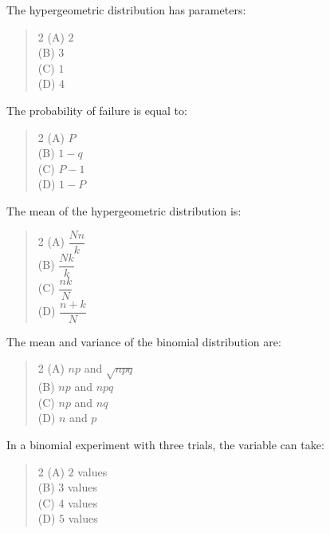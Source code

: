\documentclass[11pt,a4paper]{article}
\begin{document}
\begin{mcqlist}
\item The hypergeometric distribution has \underline{\hspace{1.5cm}} parameters:
\begin{quote}\begin{multicols}{2}
\noindent (A) $2$ \\
(B) $3$ \\
(C) $1$ \\
(D) $4$
\end{multicols}\end{quote}

\item The probability of failure is equal to:
\begin{quote}\begin{multicols}{2}
\noindent (A) $P$ \\
(B) $1-q$ \\
(C) $P-1$ \\
(D) $1-P$
\end{multicols}\end{quote}

\item The mean of the hypergeometric distribution is:
\begin{quote}\begin{multicols}{2}
\noindent (A) $\dfrac{Nn}{k}$ \\
(B) $\dfrac{Nk}{k}$ \\
(C) $\dfrac{nk}{N}$ \\
(D) $\dfrac{n+k}{N}$
\end{multicols}\end{quote}

\item The mean and variance of the binomial distribution are:
\begin{quote}\begin{multicols}{2}
\noindent (A) $np$ and $\sqrt{npq}$ \\
(B) $np$ and $npq$ \\
(C) $np$ and $nq$ \\
(D) $n$ and $p$
\end{multicols}\end{quote}

\item In a binomial experiment with three trials, the variable can take:
\begin{quote}\begin{multicols}{2}
\noindent (A) $2$ values \\
(B) $3$ values \\
(C) $4$ values \\
(D) $5$ values
\end{multicols}\end{quote}


\end{mcqlist}
\end{document}
